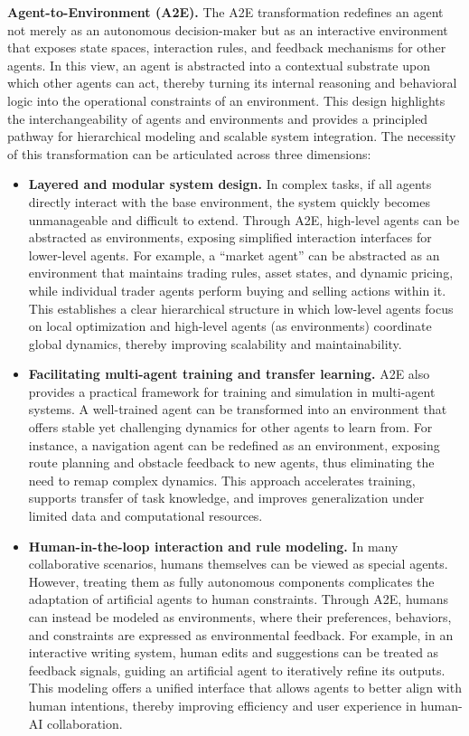 \documentclass[11pt]{article}
\begin{document}
\textbf{Agent-to-Environment (A2E).} The A2E transformation redefines an agent not merely as an autonomous decision-maker but as an interactive environment that exposes state spaces, interaction rules, and feedback mechanisms for other agents. In this view, an agent is abstracted into a contextual substrate upon which other agents can act, thereby turning its internal reasoning and behavioral logic into the operational constraints of an environment. This design highlights the interchangeability of agents and environments and provides a principled pathway for hierarchical modeling and scalable system integration. The necessity of this transformation can be articulated across three dimensions:

\begin{itemize}[leftmargin=*,itemsep=0.1em]
  \item \textbf{Layered and modular system design.} 
  In complex tasks, if all agents directly interact with the base environment, the system quickly becomes unmanageable and difficult to extend. Through A2E, high-level agents can be abstracted as environments, exposing simplified interaction interfaces for lower-level agents. For example, a ``market agent'' can be abstracted as an environment that maintains trading rules, asset states, and dynamic pricing, while individual trader agents perform buying and selling actions within it. This establishes a clear hierarchical structure in which low-level agents focus on local optimization and high-level agents (as environments) coordinate global dynamics, thereby improving scalability and maintainability.  

  \item \textbf{Facilitating multi-agent training and transfer learning.} 
  A2E also provides a practical framework for training and simulation in multi-agent systems. A well-trained agent can be transformed into an environment that offers stable yet challenging dynamics for other agents to learn from. For instance, a navigation agent can be redefined as an environment, exposing route planning and obstacle feedback to new agents, thus eliminating the need to remap complex dynamics. This approach accelerates training, supports transfer of task knowledge, and improves generalization under limited data and computational resources.  

  \item \textbf{Human-in-the-loop interaction and rule modeling.} 
  In many collaborative scenarios, humans themselves can be viewed as special agents. However, treating them as fully autonomous components complicates the adaptation of artificial agents to human constraints. Through A2E, humans can instead be modeled as environments, where their preferences, behaviors, and constraints are expressed as environmental feedback. For example, in an interactive writing system, human edits and suggestions can be treated as feedback signals, guiding an artificial agent to iteratively refine its outputs. This modeling offers a unified interface that allows agents to better align with human intentions, thereby improving efficiency and user experience in human-AI collaboration.  
\end{itemize}
\end{document}
